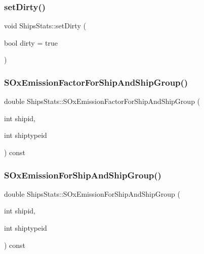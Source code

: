 \mbox{\label{class_ships_stats_a597a82c3a874eea69867bb94e9988b40}} 
\subsubsection{\texorpdfstring{setDirty()}{setDirty()}}
{\footnotesize\ttfamily void Ships\+Stats\+::set\+Dirty (\begin{DoxyParamCaption}\item[{bool}]{dirty = {\ttfamily true} }\end{DoxyParamCaption})\hspace{0.3cm}{\ttfamily [inline]}}

\mbox{\label{class_ships_stats_ad5dc03bdec4e1f2b436a30fa0801b79f}} 
\subsubsection{\texorpdfstring{SOxEmissionFactorForShipAndShipGroup()}{SOxEmissionFactorForShipAndShipGroup()}}
{\footnotesize\ttfamily double Ships\+Stats\+::\+S\+Ox\+Emission\+Factor\+For\+Ship\+And\+Ship\+Group (\begin{DoxyParamCaption}\item[{int}]{shipid,  }\item[{int}]{shiptypeid }\end{DoxyParamCaption}) const}

\mbox{\label{class_ships_stats_a976438da1433ee6ccf0e48697e8081be}} 
\subsubsection{\texorpdfstring{SOxEmissionForShipAndShipGroup()}{SOxEmissionForShipAndShipGroup()}}
{\footnotesize\ttfamily double Ships\+Stats\+::\+S\+Ox\+Emission\+For\+Ship\+And\+Ship\+Group (\begin{DoxyParamCaption}\item[{int}]{shipid,  }\item[{int}]{shiptypeid }\end{DoxyParamCaption}) const}



